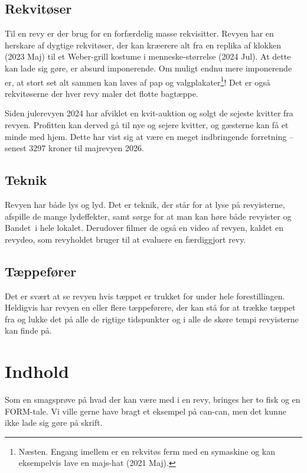 \subsection{Rekvitøser}
Til en revy er der brug for en forfærdelig masse rekvisitter. Revyen har en herskare af dygtige rekvitøser, der kan kræerere alt fra en replika af klokken (2023 Maj) til et Weber-grill kostume i menneske-størrelse (2024 Jul). At dette kan lade sig gøre, er absurd imponerende. Om muligt endnu mere imponerende er, at stort set alt sammen kan laves af pap og valgplakater\footnote{Næsten. Engang imellem er en rekvitøs ferm med en symaskine og kan eksempelvis lave en majs-hat (2021 Maj).}! Det er også rekvitøserne der hver revy maler det flotte bagtæppe.

Siden julerevyen 2024 har \CERM afviklet en kvit-auktion og solgt de sejeste kvitter fra revyen. Profitten kan derved gå til nye og sejere kvitter, og gæsterne kan få et minde med hjem. Dette har vist sig at være en meget indbringende forretning -- senest 3297 kroner til majrevyen 2026.

\subsection{Teknik}
Revyen har både lys og lyd. Det er teknik, der står for at lyse på revyisterne, afspille de mange lydeffekter, samt sørge for at man kan høre både revyister og Bandet\texttrademark\ i hele lokalet. Derudover filmer de også en video af revyen, kaldet en revydeo, som revyholdet bruger til at evaluere en færdiggjort revy.


\subsection{Tæppefører}
Det er svært at se revyen hvis tæppet er trukket for under hele forestillingen. Heldigvis har revyen en eller flere tæppeførere, der kan stå for at trække tæppet fra og lukke det på alle de rigtige tidspunkter og i alle de skøre tempi revyisterne kan finde på.

\section{Indhold}
Som en smagsprøve på hvad der kan være med i en revy, bringes her to fisk og en FORM-tale. Vi ville gerne have bragt et eksempel på can-can, men det kunne ikke lade sig gøre på skrift.


